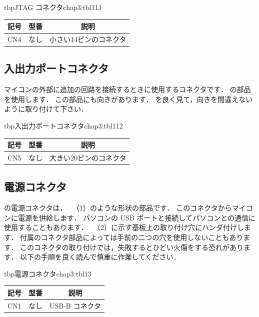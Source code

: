 \begin{mytable}{tbp}{JTAG コネクタ}{chap3:tbl111}
{\small\begin{tabular}{l|l|l}
\hline
\hline
\multicolumn{1}{c|}{記号} &
\multicolumn{1}{c|}{型番} &
\multicolumn{1}{c}{説明} \\
\hline
CN4 & なし & 小さい14ピンのコネクタ \\
\end{tabular}}
\end{mytable}


\subsection{入出力ポートコネクタ}
マイコンの外部に追加の回路を接続するときに使用するコネクタです．
の部品を使用します．
この部品にも向きがあります．
を良く見て，向きを間違えないように取り付けて下さい．

\begin{mytable}{tbp}{入出力ポートコネクタ}{chap3:tbl112}
{\small\begin{tabular}{l|l|l}
\hline
\hline
\multicolumn{1}{c|}{記号} &
\multicolumn{1}{c|}{型番} &
\multicolumn{1}{c}{説明} \\
\hline
CN5 & なし & 大きい20ピンのコネクタ \\
\end{tabular}}
\end{mytable}


\subsection{電源コネクタ}

の電源コネクタは，
~（1）のような形状の部品です．
このコネクタからマイコンに電源を供給します．
パソコンの USB ポートと接続してパソコンとの通信に使用することもあります．
~（2）に示す基板上の取り付け穴にハンダ付けします．
付属のコネクタ部品によっては手前の二つの穴を使用しないこともあります．
このコネクタの取り付けでは，失敗するとひどい火傷をする恐れがあります．
以下の手順を良く読んで慎重に作業してください．

\begin{mytable}{tbp}{電源コネクタ}{chap3:tbl13}
{\small\begin{tabular}{l|l|l}
\hline
\hline
\multicolumn{1}{c|}{記号} &
\multicolumn{1}{c|}{型番} &
\multicolumn{1}{c}{説明} \\
\hline
CN1 & なし & USB-B コネクタ \\
\end{tabular}}
\end{mytable}

